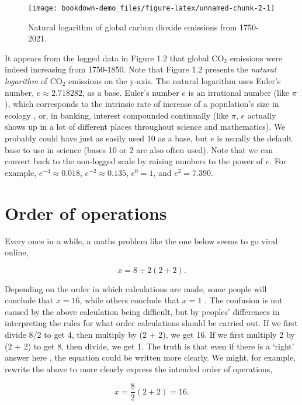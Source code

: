\documentclass[
  openany]{scrbook}
\begin{document}
\begin{figure}
\texttt{[image: bookdown-demo\_files/figure-latex/unnamed-chunk-2-1]} \caption{Natural logarithm of global carbon dioxide emissions from 1750-2021.}\label{fig:unnamed-chunk-2}
\end{figure}

It appears from the logged data in Figure 1.2 that global CO\(_{2}\) emissions were indeed increasing from 1750-1850.
Note that Figure 1.2 presents the \emph{natural logarithm} of CO\(_{2}\) emissions on the y-axis.
The natural logarithm uses Euler's number, \(e \approx 2.718282\), as a base.
Euler's number \(e\) is an irrational number (like \(\pi\)), which corresponds to the intrinsic rate of increase of a population's size in ecology \citep{Gotelli2001}, or, in banking, interest compounded continually (like \(\pi\), \(e\) actually shows up in a lot of different places throughout science and mathematics).
We probably could have just as easily used 10 as a base, but \(e\) is usually the default base to use in science (bases 10 or 2 are also often used).
Note that we can convert back to the non-logged scale by raising numbers to the power of \(e\).
For example, \(e^{-4} \approx 0.018\), \(e^{-2} \approx 0.135\), \(e^{0} = 1\), and \(e^{2} = 7.390\).

\hypertarget{order-of-operations}{%
\section{Order of operations}\label{order-of-operations}}

Every once in a while, a maths problem like the one below seems to go viral online,

\[x = 8 \div 2\left(2+2\right).\]

Depending on the order in which calculations are made, some people will conclude that \(x = 16\), while others conclude that \(x = 1\) \citep{Chernoff2022}.
The confusion is not caused by the above calculation being difficult, but by peoples' differences in interpreting the rules for what order calculations should be carried out.
If we first divide 8/2 to get 4, then multiply by (2 + 2), we get 16.
If we first multiply 2 by (2 + 2) to get 8, then divide, we get 1.
The truth is that even if there is a `right' answer here \citep{Chernoff2022}, the equation could be written more clearly.
We might, for example, rewrite the above to more clearly express the intended order of operations,

\[x = \frac{8}{2}\left(2 + 2\right) = 16.\]
\end{document}
